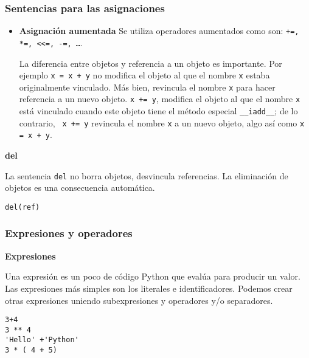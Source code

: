 \documentclass[10pt]{beamer}
\begin{document}
\begin{frame}[fragile]
\frametitle{Sentencias para las asignaciones}

\vspace{0.2cm}


\begin{itemize}
\item \textbf{Asignaci\'on aumentada} Se utiliza operadores aumentados como son: \texttt{+=, *=, <<=, -=,  \dots}. 
\vspace{0.2cm}

La diferencia entre objetos y referencia a un objeto es importante. Por ejemplo \texttt{x = x + y} no modifica el objeto al que el nombre \texttt{x} estaba originalmente vinculado. M\'as bien, revincula el nombre \texttt{x} para hacer referencia a un nuevo objeto. \texttt{x += y}, modifica el objeto al que el nombre \texttt{x} est\'a vinculado cuando este objeto tiene el m\'etodo especial \texttt{\_\_iadd\_\_}; de lo contrario, \texttt{ x += y} revincula el nombre \texttt{x} a un  nuevo objeto, algo as\'i como \texttt{x = x + y}. 
\end{itemize}

\vspace{0.2cm}

\textbf{del}

\vspace{0.2cm}

La sentencia \texttt{del} no borra objetos, desvincula referencias. La eliminaci\'on de objetos es una consecuencia autom\'atica.

\vspace{0.2cm}

\begin{lstlisting}
del(ref)
\end{lstlisting}
\end{frame}

\begin{frame}[fragile]
\frametitle{Expresiones y operadores}

\textbf{Expresiones}
\vspace{0.2cm}

Una expresi\'on es un poco de c\'odigo Python que eval\'ua para producir un valor. Las expresiones m\'as simples son los literales e identificadores. Podemos crear otras expresiones uniendo subexpresiones y operadores y/o separadores.

\vspace{0.2cm}

\begin{lstlisting}
3+4
3 ** 4
'Hello' +'Python'
3 * ( 4 + 5)
\end{lstlisting}
\end{frame}
\end{document}
